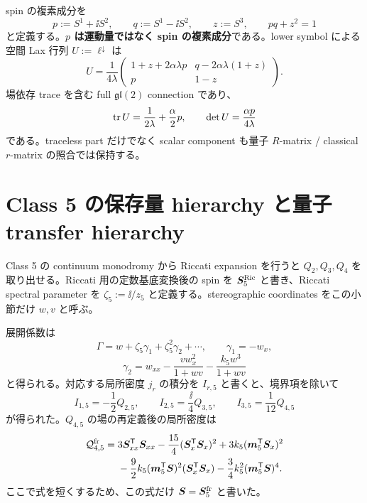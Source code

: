 spin の複素成分を
\begin{equation}
p:=S^1+\ii S^2,\qquad q:=S^1-\ii S^2,\qquad z:=S^3,
\qquad pq+z^2=1
\label{eq:C5pqz}
\end{equation}
と定義する。\textbf{$p$ は運動量ではなく spin の複素成分}である。lower symbol による空間 Lax 行列 $U:=\ell^\downarrow$ は
\begin{equation}
U=\frac1{4\lambda}
\begin{pmatrix}
1+z+2\alpha\lambda p&q-2\alpha\lambda(1+z)\\
p&1-z
\end{pmatrix}.
\label{eq:C5Uquant}
\end{equation}
場依存 trace を含む full $\mathfrak{gl}(2)$ connection であり、
\begin{equation}
\operatorname{tr} U=\frac1{2\lambda}+\frac\alpha2p,
\qquad \det U=\frac{\alpha p}{4\lambda}
\label{eq:C5trace}
\end{equation}
である。traceless part だけでなく scalar component も量子 $R$-matrix / classical $r$-matrix の照合では保持する。

\section{Class 5 の保存量 hierarchy と量子 transfer hierarchy}
Class 5 の continuum monodromy から Riccati expansion を行うと $Q_2,Q_3,Q_4$ を取り出せる。Riccati 用の定数基底変換後の spin を $\boldsymbol S_5^{\rm Ric}$ と書き、Riccati spectral parameter を $\zeta_5:=\ii/z_5$ と定義する。stereographic coordinates をこの小節だけ $w,v$ と呼ぶ。

展開係数は
\begin{equation}
\Gamma=w+\zeta_5\gamma_1+\zeta_5^2\gamma_2+\cdots,
\qquad
\gamma_1=-w_x,
\end{equation}
\begin{equation}
\gamma_2=w_{xx}-\frac{v w_x^2}{1+wv}-\frac{k_5w^3}{1+wv}
\end{equation}
と得られる。対応する局所密度 $j_r$ の積分を $I_{r,5}$ と書くと、境界項を除いて
\begin{equation}
I_{1,5}=-\frac12Q_{2,5},\qquad
I_{2,5}=\frac{\ii}{4}Q_{3,5},\qquad
I_{3,5}=\frac1{12}Q_{4,5}
\label{eq:charges5}
\end{equation}
が得られた。$Q_{4,5}$ の場の再定義後の局所密度は
\begin{align}
\mathcal Q_{4,5}^{\rm fr}={}&3\boldsymbol S_{xx}^{\mathsf T}\boldsymbol S_{xx}
-\frac{15}{4}(\boldsymbol S_x^{\mathsf T}\boldsymbol S_x)^2
+3k_5(\boldsymbol m_5^{\mathsf T}\boldsymbol S_x)^2\notag\\
&-\frac92k_5(\boldsymbol m_5^{\mathsf T}\boldsymbol S)^2(\boldsymbol S_x^{\mathsf T}\boldsymbol S_x)
-\frac34k_5^2(\boldsymbol m_5^{\mathsf T}\boldsymbol S)^4.
\label{eq:Q45}
\end{align}
ここで式を短くするため、この式だけ $\boldsymbol S=\boldsymbol S_5^{\rm fr}$ と書いた。

